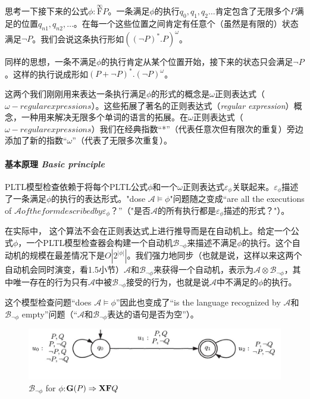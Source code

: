\documentclass{book}
\begin{document}
    思考一下接下来的公式$\phi:\overset{\infty}{\mathrm{F}}P$。一条满足$\phi$的执行$q_0,q_1,q_2\dots$肯定包含了无限多个$P$满足的位置$q_{n1},q_{n2},\dots$。在每一个这些位置之间肯定有任意个（虽然是有限的）状态满足$\neg P$。我们会说这条执行形如$((\neg P)^*.P)^\omega$。

    同样的思想，一条不满足$\phi$的执行肯定从某个位置开始，接下来的状态只会满足$\neg P$。这样的执行说成形如$(P + \neg P)^*.(\neg P)^\omega$。

    这两个我们刚刚用来表达一条执行满足$\phi$的形式的概念是$\omega$正则表达式（$\omega-regular expressions$）。这些拓展了著名的正则表达式（{\itshape regular expression}）概念，一种用来解决无限多个单词的语言的拓展。在$\omega$正则表达式（$\omega-regular expressions$）我们在经典指数“*”（代表任意次但有限次的重复）旁边添加了新的指数“$\omega$”（代表了无限多次重复）。

    \paragraph{基本原理 {\itshape Basic principle}} PLTL模型检查依赖于将每个PLTL公式$\phi$和一个$\omega$正则表达式$\varepsilon_\phi$关联起来。$\varepsilon_\phi$描述了一条满足$\phi$的执行的表达形式。"dose $\mathcal{A}\models\phi$"问题随之变成“are all the executions of $\mathcal{A} of the form described by \varepsilon_\phi$？”（"是否$\mathcal{A}$的所有执行都是$\varepsilon_\phi$描述的形式？"）。

    在实际中， 这个算法不会在正则表达式上进行推导而是在自动机上。给定一个公式$\phi$，一个PLTL模型检查器会构建一个自动机$\mathcal{B}_{\neg\phi}$来描述不满足$\phi$的执行。这个自动机的规模在最差情况下是$O|2^{|\phi|}|$。我们强力地同步（也就是说，这样以来这两个自动机会同时演变，看1.5小节）$\mathcal{A}$和$\mathcal{B}_{\neg\phi}$来获得一个自动机，表示为$\mathcal{A}\otimes\mathcal{B}_{\neg\phi}$，其中唯一存在的行为只有$\mathcal{A}$中被$\mathcal{B}_{\neg\phi}$接受的行为，也就是说$\mathcal{A}$中不满足的$\phi$的执行。

    这个模型检查问题“does $\mathcal{A}\models\phi$”因此也变成了“is the language recognized by $\mathcal{A}$和$\mathcal{B}_{\neg\phi}$ empty”问题（“$\mathcal{A}$和$\mathcal{B}_{\neg\phi}$表达的语句是否为空”）。
    \begin{figure}
        \centering
        \includegraphics[width=4.0IN]{3_1.JPG}
        \caption{$\mathcal{B}_{\neg\phi}$ for $\phi$:$\text{\textbf{G}}(P)\Rightarrow\text{\textbf{X}}\text{\textbf{F}}Q$}
    \end{figure}
\end{document}
